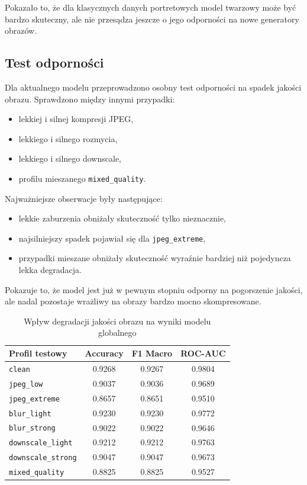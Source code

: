 Pokazało to, że dla klasycznych danych portretowych model twarzowy może być bardzo skuteczny, ale nie przesądza jeszcze o jego odporności na nowe generatory obrazów.

\subsection{Test odporności}

Dla aktualnego modelu przeprowadzono osobny test odporności na spadek jakości obrazu. Sprawdzono między innymi przypadki:

\begin{itemize}
    \item lekkiej i silnej kompresji JPEG,
    \item lekkiego i silnego rozmycia,
    \item lekkiego i silnego downscale,
    \item profilu mieszanego \texttt{mixed\_quality}.
\end{itemize}

Najważniejsze obserwacje były następujące:

\begin{itemize}
    \item lekkie zaburzenia obniżały skuteczność tylko nieznacznie,
    \item najsilniejszy spadek pojawiał się dla \texttt{jpeg\_extreme},
    \item przypadki mieszane obniżały skuteczność wyraźnie bardziej niż pojedyncza lekka degradacja.
\end{itemize}

Pokazuje to, że model jest już w pewnym stopniu odporny na pogorszenie jakości, ale nadal pozostaje wrażliwy na obrazy bardzo mocno skompresowane.

\begin{table}[H]
\centering
\caption{Wpływ degradacji jakości obrazu na wyniki modelu globalnego}
\label{tab:robustness}
\begin{tabular}{|L{3.5cm}|c|c|c|}
\hline
\textbf{Profil testowy} & \textbf{Accuracy} & \textbf{F1 Macro} & \textbf{ROC-AUC} \\
\hline
\texttt{clean} & 0.9268 & 0.9267 & 0.9804 \\
\hline
\texttt{jpeg\_low} & 0.9037 & 0.9036 & 0.9689 \\
\hline
\texttt{jpeg\_extreme} & 0.8657 & 0.8651 & 0.9510 \\
\hline
\texttt{blur\_light} & 0.9230 & 0.9230 & 0.9772 \\
\hline
\texttt{blur\_strong} & 0.9022 & 0.9022 & 0.9646 \\
\hline
\texttt{downscale\_light} & 0.9212 & 0.9212 & 0.9763 \\
\hline
\texttt{downscale\_strong} & 0.9047 & 0.9047 & 0.9673 \\
\hline
\texttt{mixed\_quality} & 0.8825 & 0.8825 & 0.9527 \\
\hline
\end{tabular}
\end{table}

